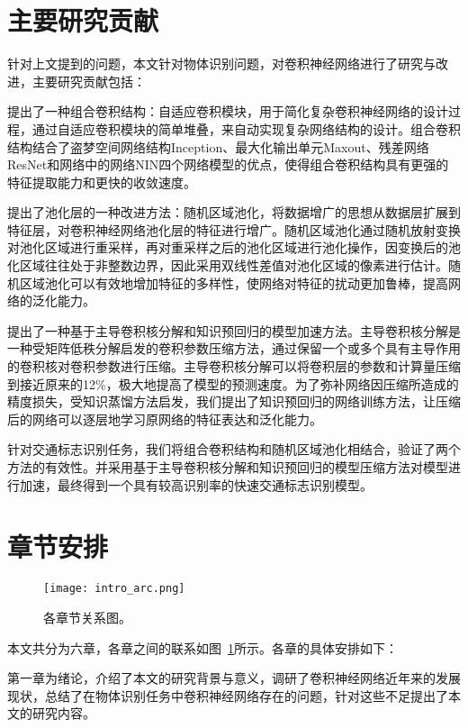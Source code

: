 \section{主要研究贡献}

针对上文提到的问题，本文针对物体识别问题，对卷积神经网络进行了研究与改进，主要研究贡献包括：

提出了一种组合卷积结构：自适应卷积模块，用于简化复杂卷积神经网络的设计过程，通过自适应卷积模块的简单堆叠，来自动实现复杂网络结构的设计。组合卷积结构结合了盗梦空间网络结构Inception、最大化输出单元Maxout、残差网络ResNet和网络中的网络NIN四个网络模型的优点，使得组合卷积结构具有更强的特征提取能力和更快的收敛速度。

提出了池化层的一种改进方法：随机区域池化，将数据增广的思想从数据层扩展到特征层，对卷积神经网络池化层的特征进行增广。随机区域池化通过随机放射变换对池化区域进行重采样，再对重采样之后的池化区域进行池化操作，因变换后的池化区域往往处于非整数边界，因此采用双线性差值对池化区域的像素进行估计。随机区域池化可以有效地增加特征的多样性，使网络对特征的扰动更加鲁棒，提高网络的泛化能力。

提出了一种基于主导卷积核分解和知识预回归的模型加速方法。主导卷积核分解是一种受矩阵低秩分解启发的卷积参数压缩方法，通过保留一个或多个具有主导作用的卷积核对卷积参数进行压缩。主导卷积核分解可以将卷积层的参数和计算量压缩到接近原来的12\%，极大地提高了模型的预测速度。为了弥补网络因压缩所造成的精度损失，受知识蒸馏方法启发，我们提出了知识预回归的网络训练方法，让压缩后的网络可以逐层地学习原网络的特征表达和泛化能力。

针对交通标志识别任务，我们将组合卷积结构和随机区域池化相结合，验证了两个方法的有效性。并采用基于主导卷积核分解和知识预回归的模型压缩方法对模型进行加速，最终得到一个具有较高识别率的快速交通标志识别模型。

\section{章节安排}


\begin{figure}[h]
\centering
\texttt{[image: intro\_arc.png]}
\caption{各章节关系图。}
\label{fig:intro_arc}
\end{figure}

本文共分为六章，各章之间的联系如图~\ref{fig:intro_arc}所示。各章的具体安排如下：

第一章为绪论，介绍了本文的研究背景与意义，调研了卷积神经网络近年来的发展现状，总结了在物体识别任务中卷积神经网络存在的问题，针对这些不足提出了本文的研究内容。


